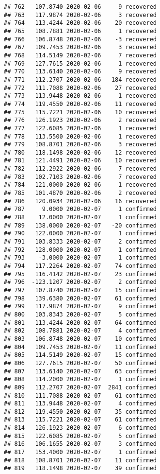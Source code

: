 \documentclass[
]{article}
\begin{document}
\begin{verbatim}
## 762   107.8740 2020-02-06     9 recovered
## 763   117.9874 2020-02-06     3 recovered
## 764   113.4244 2020-02-06    20 recovered
## 765   108.7881 2020-02-06     1 recovered
## 766   106.8748 2020-02-06    -3 recovered
## 767   109.7453 2020-02-06     3 recovered
## 768   114.5149 2020-02-06     7 recovered
## 769   127.7615 2020-02-06     1 recovered
## 770   113.6140 2020-02-06     9 recovered
## 771   112.2707 2020-02-06   184 recovered
## 772   111.7088 2020-02-06    27 recovered
## 773   113.9448 2020-02-06     1 recovered
## 774   119.4550 2020-02-06    11 recovered
## 775   115.7221 2020-02-06    10 recovered
## 776   126.1923 2020-02-06     2 recovered
## 777   122.6085 2020-02-06     1 recovered
## 778   113.5500 2020-02-06     1 recovered
## 779   108.8701 2020-02-06     3 recovered
## 780   118.1498 2020-02-06    12 recovered
## 781   121.4491 2020-02-06    10 recovered
## 782   112.2922 2020-02-06     7 recovered
## 783   102.7103 2020-02-06     7 recovered
## 784   121.0000 2020-02-06     1 recovered
## 785   101.4870 2020-02-06     2 recovered
## 786   120.0934 2020-02-06    16 recovered
## 787     9.0000 2020-02-07     1 confirmed
## 788    12.0000 2020-02-07     1 confirmed
## 789   138.0000 2020-02-07   -20 confirmed
## 790   122.0000 2020-02-07     1 confirmed
## 791   103.8333 2020-02-07     2 confirmed
## 792   128.0000 2020-02-07     1 confirmed
## 793    -3.0000 2020-02-07     1 confirmed
## 794   117.2264 2020-02-07    74 confirmed
## 795   116.4142 2020-02-07    23 confirmed
## 796  -123.1207 2020-02-07     2 confirmed
## 797   107.8740 2020-02-07    15 confirmed
## 798   139.6380 2020-02-07    61 confirmed
## 799   117.9874 2020-02-07     9 confirmed
## 800   103.8343 2020-02-07     5 confirmed
## 801   113.4244 2020-02-07    64 confirmed
## 802   108.7881 2020-02-07     4 confirmed
## 803   106.8748 2020-02-07    10 confirmed
## 804   109.7453 2020-02-07    11 confirmed
## 805   114.5149 2020-02-07    15 confirmed
## 806   127.7615 2020-02-07    50 confirmed
## 807   113.6140 2020-02-07    63 confirmed
## 808   114.2000 2020-02-07     1 confirmed
## 809   112.2707 2020-02-07  2841 confirmed
## 810   111.7088 2020-02-07    61 confirmed
## 811   113.9448 2020-02-07     4 confirmed
## 812   119.4550 2020-02-07    35 confirmed
## 813   115.7221 2020-02-07    61 confirmed
## 814   126.1923 2020-02-07     6 confirmed
## 815   122.6085 2020-02-07     5 confirmed
## 816   106.1655 2020-02-07     3 confirmed
## 817   153.4000 2020-02-07     1 confirmed
## 818   108.8701 2020-02-07    11 confirmed
## 819   118.1498 2020-02-07    39 confirmed

\end{verbatim}
\end{document}
